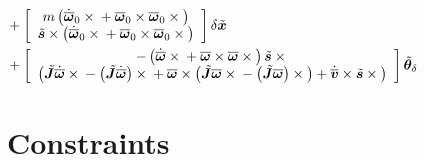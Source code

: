 \documentclass[10pt,dvips,fleqn,subeqn]{report}
\newcommand{\T}[1]{\bm{#1}}
\newcommand{\TT}[1]{\bm{#1}}
\begin{document}
\begin{align}
	\nonumber \\ & \hspace{-20mm}
	+ \sqbr{\matr{c}{
		m \plbr{
			\dot{\overline{\T{\omega}}}_0 \times{}
			+ \overline{\T{\omega}}_0 \times \overline{\T{\omega}}_0 \times{}
		} \\
		\tilde{\T{s}} \times \plbr{
			\dot{\overline{\T{\omega}}}_0 \times{}
			+ \overline{\T{\omega}}_0 \times \overline{\T{\omega}}_0 \times{}
		}
	}} \delta\tilde{\T{x}}
	\nonumber \\ & \hspace{-20mm}
	+ \sqbr{\matr{c}{
		- \plbr{
			\dot{\overline{\T{\omega}}} \times{}
			+ \overline{\T{\omega}} \times \overline{\T{\omega}} \times{}
		} \tilde{\T{s}}\times{} \\
		\plbr{
			\tilde{\TT{J}} \dot{\overline{\T{\omega}}} \times{}
			- \plbr{\tilde{\TT{J}} \dot{\overline{\T{\omega}}}} \times{}
			+ \overline{\T{\omega}} \times \plbr{
				\tilde{\T{J}} \overline{\T{\omega}} \times{}
				- \plbr{\tilde{\TT{J}} \overline{\T{\omega}}} \times{}
			}
			+ \dot{\overline{\T{v}}} \times \tilde{\T{s}} \times{}
		}
	}} \tilde{\T{\theta}}_{\delta}
\end{align}








\chapter{Constraints}
\end{document}
